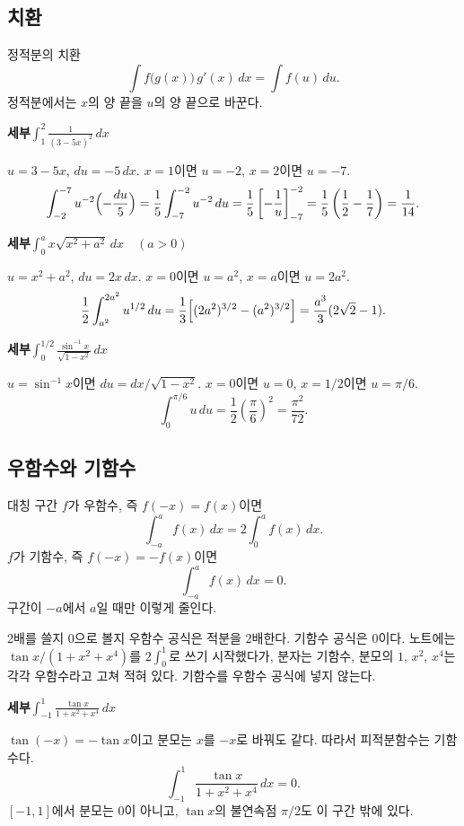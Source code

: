 \documentclass[11pt]{article}
\newcommand{\ex}[1]{\par\textbf{세부\quad #1}\par}
\begin{document}
\subsection{치환}

\begin{mainbox}{정적분의 치환}
\[
\int f\bigl(g(x)\bigr)\,g'(x)\,dx=\int f(u)\,du.
\]
정적분에서는 \(x\)의 양 끝을 \(u\)의 양 끝으로 바꾼다.
\end{mainbox}

\ex{\(\displaystyle\int_{1}^{2}\frac{1}{(3-5x)^{2}}\,dx\)}
\(u=3-5x\), \(du=-5\,dx\). \(x=1\)이면 \(u=-2\), \(x=2\)이면 \(u=-7\).
\[
\int_{-2}^{-7}u^{-2}\Bigl(-\frac{du}{5}\Bigr)
=\frac15\int_{-7}^{-2}u^{-2}\,du
=\frac15\left[-\frac{1}{u}\right]_{-7}^{-2}
=\frac15\left(\frac12-\frac17\right)
=\frac{1}{14}.
\]

\ex{\(\displaystyle\int_{0}^{a}x\sqrt{x^{2}+a^{2}}\,dx\quad(a>0)\)}
\(u=x^{2}+a^{2}\), \(du=2x\,dx\). \(x=0\)이면 \(u=a^{2}\), \(x=a\)이면 \(u=2a^{2}\).
\[
\frac12\int_{a^{2}}^{2a^{2}}u^{1/2}\,du
=\frac13\Bigl[(2a^{2})^{3/2}-(a^{2})^{3/2}\Bigr]
=\frac{a^{3}}{3}(2\sqrt{2}-1).
\]

\ex{\(\displaystyle\int_{0}^{1/2}\frac{\sin^{-1}x}{\sqrt{1-x^{2}}}\,dx\)}
\(u=\sin^{-1}x\)이면 \(du=dx/\sqrt{1-x^{2}}\). \(x=0\)이면 \(u=0\), \(x=1/2\)이면 \(u=\pi/6\).
\[
\int_{0}^{\pi/6}u\,du=\frac12\left(\frac{\pi}{6}\right)^{2}=\frac{\pi^{2}}{72}.
\]

\subsection{우함수와 기함수}

\begin{mainbox}{대칭 구간}
\(f\)가 우함수, 즉 \(f(-x)=f(x)\)이면
\[
\int_{-a}^{a}f(x)\,dx=2\int_{0}^{a}f(x)\,dx.
\]
\(f\)가 기함수, 즉 \(f(-x)=-f(x)\)이면
\[
\int_{-a}^{a}f(x)\,dx=0.
\]
구간이 \(-a\)에서 \(a\)일 때만 이렇게 줄인다.
\end{mainbox}

\begin{confbox}{2배를 쓸지 0으로 볼지}
우함수 공식은 적분을 \(2\)배한다. 기함수 공식은 \(0\)이다. 노트에는 \(\tan x/(1+x^{2}+x^{4})\)를 \(2\int_{0}^{1}\)로 쓰기 시작했다가, 분자는 기함수, 분모의 \(1\), \(x^{2}\), \(x^{4}\)는 각각 우함수라고 고쳐 적혀 있다. 기함수를 우함수 공식에 넣지 않는다.
\end{confbox}

\ex{\(\displaystyle\int_{-1}^{1}\frac{\tan x}{1+x^{2}+x^{4}}\,dx\)}
\(\tan(-x)=-\tan x\)이고 분모는 \(x\)를 \(-x\)로 바꿔도 같다. 따라서 피적분함수는 기함수다.
\[
\int_{-1}^{1}\frac{\tan x}{1+x^{2}+x^{4}}\,dx=0.
\]
\([-1,1]\)에서 분모는 \(0\)이 아니고, \(\tan x\)의 불연속점 \(\pi/2\)도 이 구간 밖에 있다.
\end{document}
